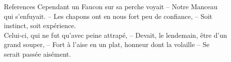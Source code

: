 \documentclass{LaBRI_poster}
\begin{document}
\begin{frame}[t]
\begin{columns}[t]
\begin{column}{\sepwidth}\end{column} %

\end{columns}

\begin{columns}[t] 

\begin{column}{\sepwidth}\end{column} %

\begin{column}{\onecolwidth}
\begin{block}{References}
Cependant un Faucon sur sa perche voyait -- 
Notre Manceau qui s’enfuyait. -- 
Les chapons ont en nous fort peu de confiance, --  
Soit instinct, soit expérience.\\
Celui-ci, qui ne fut qu’avec peine attrapé, -- 
Devait, le lendemain, être d’un grand souper, -- 
Fort à l’aise en un plat, honneur dont la volaille -- 
Se serait passée aisément.
\end{block}
\end{column}

\begin{column}{\sepwidth}\end{column} %

\end{columns}


\end{frame}
\end{document}
